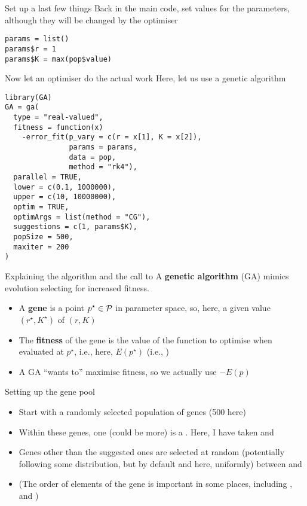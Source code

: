 \documentclass[aspectratio=169]{beamer}
\begin{document}
\begin{frame}[fragile]{Set up a last few things}
Back in the main code, set values for the parameters, although they will be changed by the optimiser
\begin{lstlisting}
params = list()
params$r = 1
params$K = max(pop$value)
\end{lstlisting}
\end{frame}

\begin{frame}[fragile]{Now let an optimiser do the actual work}
Here, let us use a genetic algorithm
\begin{lstlisting}
library(GA)
GA = ga(
  type = "real-valued",
  fitness = function(x) 
    -error_fit(p_vary = c(r = x[1], K = x[2]),
               params = params,
               data = pop,
               method = "rk4"),
  parallel = TRUE,
  lower = c(0.1, 1000000),
  upper = c(10, 10000000),
  optim = TRUE,
  optimArgs = list(method = "CG"),
  suggestions = c(1, params$K),
  popSize = 500,
  maxiter = 200
)
\end{lstlisting}
\end{frame}

\begin{frame}{Explaining the algorithm and the call to }
    A \textbf{genetic algorithm} (GA) mimics evolution selecting for increased fitness.
    \vfill
    \begin{itemize}
        \item A \textbf{gene} is a point $p^\star\in\P$ in parameter space, so, here, a given value $(r^\star,K^\star)$ of $(r,K)$
        \item The \textbf{fitness} of the gene is the value of the function to optimise when evaluated at $p^\star$, i.e., here, $E(p^\star)$ (i.e., )
        \item A GA ``wants to'' maximise fitness, so we actually use $-E(p)$
    \end{itemize}
\end{frame}

\begin{frame}{Setting up the gene pool}
    \begin{itemize}
        \item Start with a randomly selected population of  genes (500 here)
        \item Within these  genes, one (could be more) is a . Here, I have taken  and 
        \item Genes other than the suggested ones are selected at random (potentially following some distribution, but by default and here, uniformly) between  and 
        \item  (The order of elements of the gene is important in some places, including ,  and )
    \end{itemize}
\end{frame}
\end{document}
